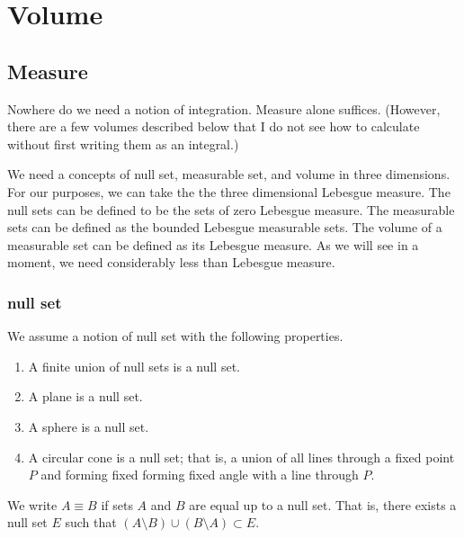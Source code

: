 
\chapter{Volume}

\section{Measure}

Nowhere do we need a notion
of integration.  Measure alone suffices.  (However, there are a few
volumes described below that I do not see how to calculate without
first writing them as an integral.)

We need a concepts of null set, measurable set, and volume in
three dimensions.  For our purposes, we can take the
the three dimensional Lebesgue measure.   
The null sets can be defined
to be the sets of zero Lebesgue measure. The measurable sets can
be defined as the bounded Lebesgue measurable sets.  The volume of
a measurable set can be defined as its Lebesgue measure.
As we will see in a moment, we need considerably less than Lebesgue measure.



\subsection{null set}\label{sec:null}

We assume a notion of null set with the following
properties.

\begin{enumerate}%
\item A finite union of null sets is a null set.\\
 \item A plane is a null set.\\
 \item A sphere is a null set.\\
 \item A circular cone is a null set; that is, a union of all
  lines through a fixed point $P$ and forming fixed
 forming fixed angle with a line through $P$.
\end{enumerate}

We write $A\equiv B$ if sets $A$ and $B$ are equal up to a null set.
That is, there exists a null set $E$ such that
   $(A\setminus B) \cup (B\setminus A) \subset E$.

